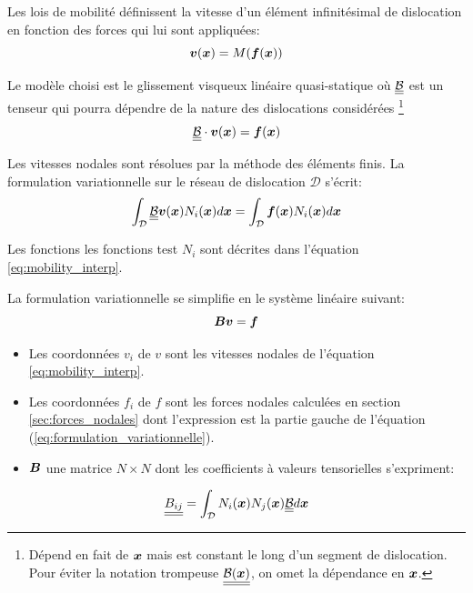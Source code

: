 \documentclass[11pt,class=article,float=false,crop=false]{standalone}
\begin{document}
Les lois de mobilité définissent la vitesse d'un élément infinitésimal de dislocation en fonction des forces qui lui sont appliquées:
\begin{equation}
\bm{v}(\bm{x}) = M(\bm{f}(\bm{x}))	
\end{equation}


Le modèle choisi est le glissement visqueux linéaire quasi-statique où $\underline{\underline{\mathcal{B} } }$ est un tenseur qui pourra dépendre de la nature des dislocations considérées \footnote{Dépend en fait de $\bm{x}$ mais est constant le long d'un segment de dislocation. Pour éviter la notation trompeuse $\underline{\underline{\mathcal{B}(\bm{x}) } }$, on omet la dépendance en $\bm{x}$.}
\begin{equation}
	\underline{\underline{\mathcal{B} } } \cdot \bm{v}(\bm{x}) = \bm{f}(\bm{x})	
\end{equation}

Les vitesses nodales sont résolues par la méthode des éléments finis. La formulation variationnelle sur le réseau de dislocation $\mathcal{D}$  s'écrit:
\begin{equation}
\int_\mathcal{D} \underline{\underline{\mathcal{B} } }  \bm{v}(\bm{x}) N_i(\bm{x})  d\bm{x} = \int_\mathcal{D} \bm{f}(\bm{x}) N_i(\bm{x}) d\bm{x}
\label{eq:formulation_variationnelle}
\end{equation}

Les fonctions les fonctions test $N_i$ sont décrites dans l'équation \ref{eq:mobility_interp}.

La formulation variationnelle se simplifie en le système linéaire suivant:
\begin{equation}
\bm{B}\bm{v} = \bm{f}
\label{eq:mobilite_systeme}
\end{equation}

\begin{itemize}
	\item Les coordonnées $v_i$ de $v$ sont les vitesses nodales de l'équation \ref{eq:mobility_interp}.
	\item Les coordonnées $f_i$ de $f$ sont les forces nodales calculées en section \ref{sec:forces_nodales} dont l'expression est la partie gauche de l'équation (\ref{eq:formulation_variationnelle}).
	\item $\bm{B}$ une matrice $N\times N$ dont les coefficients à valeurs tensorielles s'expriment:
\end{itemize}

\begin{equation}
	\underline{\underline{B_{ij} } } = \int_\mathcal{D} N_i(\bm{x}) N_j(\bm{x}) \underline{\underline{\mathcal{B} } } d\bm{x}
\end{equation}
\end{document}
